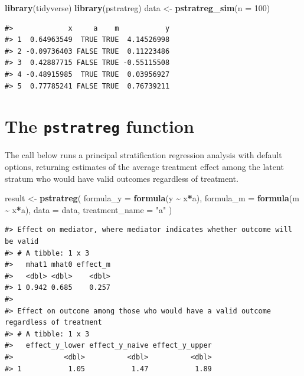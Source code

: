 \documentclass[
]{book}
\newenvironment{Shaded}{\begin{snugshade}}{\end{snugshade}}
\newcommand{\AttributeTok}[1]{\textcolor[rgb]{0.13,0.29,0.53}{#1}}
\newcommand{\DecValTok}[1]{\textcolor[rgb]{0.00,0.00,0.81}{#1}}
\newcommand{\FunctionTok}[1]{\textcolor[rgb]{0.13,0.29,0.53}{\textbf{#1}}}
\newcommand{\NormalTok}[1]{#1}
\newcommand{\OtherTok}[1]{\textcolor[rgb]{0.56,0.35,0.01}{#1}}
\newcommand{\SpecialCharTok}[1]{\textcolor[rgb]{0.81,0.36,0.00}{\textbf{#1}}}
\newcommand{\StringTok}[1]{\textcolor[rgb]{0.31,0.60,0.02}{#1}}
\begin{document}
\begin{Shaded}
\begin{Highlighting}[]
\FunctionTok{library}\NormalTok{(tidyverse)}
\FunctionTok{library}\NormalTok{(pstratreg)}
\NormalTok{data }\OtherTok{\textless{}{-}} \FunctionTok{pstratreg\_sim}\NormalTok{(}\AttributeTok{n =} \DecValTok{100}\NormalTok{)}
\end{Highlighting}
\end{Shaded}

\begin{verbatim}
#>             x     a    m           y
#> 1  0.64963549  TRUE TRUE  4.14526998
#> 2 -0.09736403 FALSE TRUE  0.11223486
#> 3  0.42887715 FALSE TRUE -0.55115508
#> 4 -0.48915985  TRUE TRUE  0.03956927
#> 5  0.77785241 FALSE TRUE  0.76739211
\end{verbatim}

\hypertarget{the-pstratreg-function}{%
\section{\texorpdfstring{The \texttt{pstratreg} function}{The pstratreg function}}\label{the-pstratreg-function}}

The call below runs a principal stratification regression analysis with default options, returning estimates of the average treatment effect among the latent stratum who would have valid outcomes regardless of treatment.

\begin{Shaded}
\begin{Highlighting}[]
\NormalTok{result }\OtherTok{\textless{}{-}} \FunctionTok{pstratreg}\NormalTok{(}
  \AttributeTok{formula\_y =} \FunctionTok{formula}\NormalTok{(y }\SpecialCharTok{\textasciitilde{}}\NormalTok{ x}\SpecialCharTok{*}\NormalTok{a),}
  \AttributeTok{formula\_m =} \FunctionTok{formula}\NormalTok{(m }\SpecialCharTok{\textasciitilde{}}\NormalTok{ x}\SpecialCharTok{*}\NormalTok{a),}
  \AttributeTok{data =}\NormalTok{ data,}
  \AttributeTok{treatment\_name =} \StringTok{"a"}
\NormalTok{)}
\end{Highlighting}
\end{Shaded}

\begin{verbatim}
#> Effect on mediator, where mediator indicates whether outcome will be valid
#> # A tibble: 1 x 3
#>   mhat1 mhat0 effect_m
#>   <dbl> <dbl>    <dbl>
#> 1 0.942 0.685    0.257
#> 
#> Effect on outcome among those who would have a valid outcome regardless of treatment
#> # A tibble: 1 x 3
#>   effect_y_lower effect_y_naive effect_y_upper
#>            <dbl>          <dbl>          <dbl>
#> 1           1.05           1.47           1.89
\end{verbatim}
\end{document}
